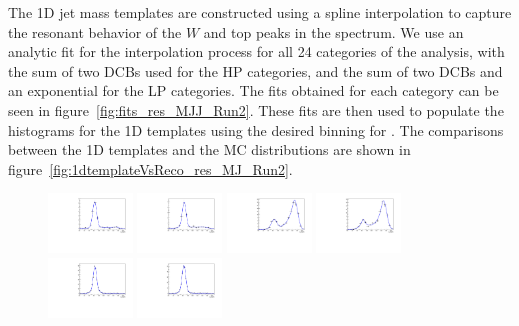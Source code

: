 The 1D jet mass templates are constructed using a spline interpolation to capture the resonant behavior of the $W$ and top peaks in the \MJ spectrum.
We use an analytic fit for the interpolation process for all 24 categories of the analysis, with the sum of two DCBs used for the HP categories, and the sum of two DCBs and an exponential for the LP categories.
The fits obtained for each category can be seen in figure~\ref{fig:fits_res_MJJ_Run2}.
These fits are then used to populate the histograms for the 1D templates using the desired binning for \MJ.
The comparisons between the 1D templates and the MC distributions are shown in figure~\ref{fig:1dtemplateVsReco_res_MJ_Run2}.

\begin{figure}[htbp]
  \centering
  \includegraphics[width=0.2\textwidth]{fig/2Dfit/LNuJJ_res_MJJ_mu_HP_bb_LDy.pdf}
  \includegraphics[width=0.2\textwidth]{fig/2Dfit/LNuJJ_res_MJJ_e_HP_bb_LDy.pdf}
  \includegraphics[width=0.2\textwidth]{fig/2Dfit/LNuJJ_res_MJJ_mu_LP_bb_LDy.pdf}
  \includegraphics[width=0.2\textwidth]{fig/2Dfit/LNuJJ_res_MJJ_e_LP_bb_LDy.pdf}\\
  \includegraphics[width=0.2\textwidth]{fig/2Dfit/LNuJJ_res_MJJ_mu_HP_nobb_LDy.pdf}
  \includegraphics[width=0.2\textwidth]{fig/2Dfit/LNuJJ_res_MJJ_e_HP_nobb_LDy.pdf}

\end{figure}
